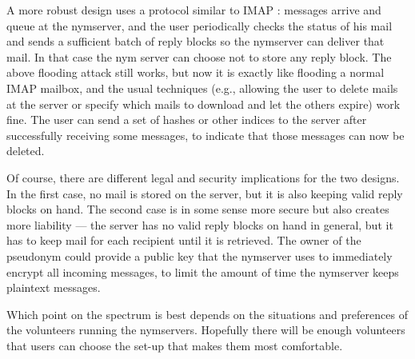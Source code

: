 \documentclass{llncs}
\renewcommand\url{\begingroup \def\UrlLeft{<}\def\UrlRight{>}\urlstyle{tt}\Url}
\begin{document}
A more robust design uses a protocol similar to IMAP \cite{IMAP}:
messages arrive and queue at the nymserver, and the user periodically
checks the status of his mail and sends a sufficient batch of reply
blocks so the nymserver can deliver that mail. In that case the nym
server can choose not to store any reply block.
The above flooding attack still works, but now it is exactly
like flooding a normal IMAP mailbox, and the usual techniques (e.g.,
allowing the user to delete mails at the server or specify which mails to
download and let the others expire) work fine. The user can send a set
of hashes or other indices to the server after successfully receiving
some messages, to indicate that those messages can now be deleted.

Of course, there are different legal and security implications for the two
designs. In the first case, no mail is stored on the server, but it is also
keeping valid reply blocks on hand. The second case is in some sense more
secure but also creates more liability --- the server has no valid reply
blocks on hand in general, but it has to keep mail for each recipient
until it is retrieved. The owner of the pseudonym could provide a public
key that the nymserver uses to immediately encrypt all incoming messages,
to limit the amount of time the nymserver keeps plaintext messages.

Which point on the spectrum is best depends on the situations and
preferences of the volunteers running the nymservers. Hopefully there
will be enough volunteers that users can choose the set-up that makes
them most comfortable.


%
%
%
%
%
\end{document}
